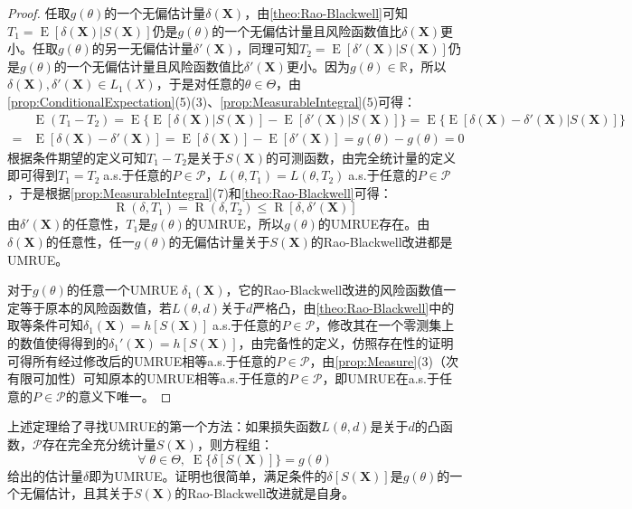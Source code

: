 \begin{proof}
	任取$g(\theta)$的一个无偏估计量$\delta(\mathbf{X})$，由\cref{theo:Rao-Blackwell}可知$T_1=\operatorname{E}[\delta(\mathbf{X})|S(\mathbf{X})]$仍是$g(\theta)$的一个无偏估计量且风险函数值比$\delta(\mathbf{X})$更小。任取$g(\theta)$的另一无偏估计量$\delta'(\mathbf{X})$，同理可知$T_2=\operatorname{E}[\delta'(\mathbf{X})|S(\mathbf{X})]$仍是$g(\theta)$的一个无偏估计量且风险函数值比$\delta'(\mathbf{X})$更小。因为$g(\theta)\in\mathbb{R}^{}$，所以$\delta(\mathbf{X}),\delta'(\mathbf{X})\in L_1(X)$，于是对任意的$\theta\in\Theta$，由\cref{prop:ConditionalExpectation}(5)(3)、\cref{prop:MeasurableIntegral}(5)可得：
	\begin{align*}
		&\operatorname{E}(T_1-T_2)=\operatorname{E}\{\operatorname{E}[\delta(\mathbf{X})|S(\mathbf{X})]-\operatorname{E}[\delta'(\mathbf{X})|S(\mathbf{X})]\}=\operatorname{E}\{\operatorname{E}[\delta(\mathbf{X})-\delta'(\mathbf{X})|S(\mathbf{X})]\} \\
		=&\operatorname{E}[\delta(\mathbf{X})-\delta'(\mathbf{X})]=\operatorname{E}[\delta(\mathbf{X})]-\operatorname{E}[\delta'(\mathbf{X})]=g(\theta)-g(\theta)=0
	\end{align*}
	根据条件期望的定义可知$T_1-T_2$是关于$S(\mathbf{X})$的可测函数，由完全统计量的定义即可得到$T_1=T_2\;$a.s.于任意的$P\in\mathscr{P}$，$L(\theta,T_1)=L(\theta,T_2)\;$a.s.于任意的$P\in\mathscr{P}$，于是根据\cref{prop:MeasurableIntegral}(7)和\cref{theo:Rao-Blackwell}可得：
	\begin{equation*}
		\operatorname{R}(\delta,T_1)=\operatorname{R}(\delta,T_2)\leqslant\operatorname{R}[\delta,\delta'(\mathbf{X})]
	\end{equation*}
	由$\delta'(\mathbf{X})$的任意性，$T_1$是$g(\theta)$的UMRUE，所以$g(\theta)$的UMRUE存在。由$\delta(\mathbf{X})$的任意性，任一$g(\theta)$的无偏估计量关于$S(\mathbf{X})$的Rao-Blackwell改进都是UMRUE。\par
	对于$g(\theta)$的任意一个UMRUE$\;\delta_1(\mathbf{X})$，它的Rao-Blackwell改进的风险函数值一定等于原本的风险函数值，若$L(\theta,d)$关于$d$严格凸，由\cref{theo:Rao-Blackwell}中的取等条件可知$\delta_1(\mathbf{X})=h[S(\mathbf{X})]\;$a.s.于任意的$P\in\mathscr{P}$，修改其在一个零测集上的数值使得得到的$\delta_1'(\mathbf{X})=h[S(\mathbf{X})]$，由完备性的定义，仿照存在性的证明可得所有经过修改后的UMRUE相等a.s.于任意的$P\in\mathscr{P}$，由\cref{prop:Measure}(3)（次有限可加性）可知原本的UMRUE相等a.s.于任意的$P\in\mathscr{P}$，即UMRUE在a.s.于任意的$P\in\mathscr{P}$的意义下唯一。
\end{proof}
\begin{note}
	上述定理给了寻找UMRUE的第一个方法：如果损失函数$L(\theta,d)$是关于$d$的凸函数，$\mathscr{P}$存在完全充分统计量$S(\mathbf{X})$，则方程组：
	\begin{equation*}
		\forall\;\theta\in\Theta,\;\operatorname{E}\{\delta[S(\mathbf{X})]\}=g(\theta)
	\end{equation*}
	给出的估计量$\delta$即为UMRUE。证明也很简单，满足条件的$\delta[S(\mathbf{X})]$是$g(\theta)$的一个无偏估计，且其关于$S(\mathbf{X})$的Rao-Blackwell改进就是自身。
\end{note}

